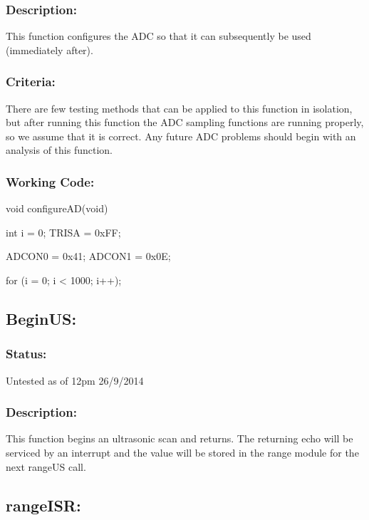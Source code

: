 \documentclass[]{article}
\begin{document}
\subsubsection{Description:}
This function configures the ADC so that it can subsequently be used (immediately after).

\subsubsection{Criteria:}
There are few testing methods that can be applied to this function in isolation, but after running this function the ADC sampling functions are running properly, so we assume that it is correct. Any future ADC problems should begin with an analysis of this function.

\subsubsection{Working Code:}
void configureAD(void) \newline
{ \newline
	int i = 0; \newline
	TRISA = 0xFF; \newline
	 
	ADCON0 = 0x41; \newline
	ADCON1 = 0x0E; \newline
	
	for (i = 0; i < 1000; i++); \newline
} \newline

\subsection{BeginUS:}
\subsubsection{Status:}
Untested as of 12pm 26/9/2014

\subsubsection{Description:}
This function begins an ultrasonic scan and returns. The returning echo will be serviced by an interrupt and the value will be stored in the range module for the next rangeUS call.

\subsection{rangeISR:}
\end{document}
